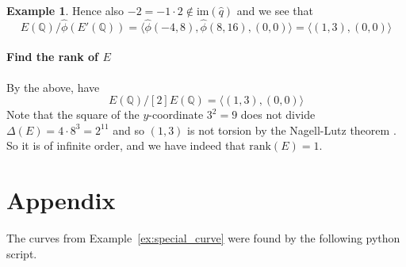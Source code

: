 \documentclass{scrartcl}
\newcommand{\Q}{\mathbb{Q}}
\newcommand{\im}{\mathrm{im}}
\theoremstyle{definition}
\newtheorem{example}[subsection]{Example}
\begin{document}
\begin{example}
    Hence also $-2 = -1 \cdot 2 \notin \im(\hat{q})$ and we see that
    \begin{equation*}
        E(\Q)/\hat{\phi}(E'(\Q)) = \langle \hat{\phi}(-4, 8), \hat{\phi}(8, 16), (0, 0) \rangle = \langle (1, 3), (0, 0) \rangle
    \end{equation*}

    \paragraph{Find the rank of $E$} By the above, have
    \begin{equation*}
        E(\Q)/[2]E(\Q) = \langle (1, 3), (0, 0) \rangle
    \end{equation*}
    Note that the square of the $y$-coordinate $3^2 = 9$ does not divide $\Delta(E) = 4 \cdot 8^3 = 2^{11}$ and so $(1, 3)$ is not torsion by the Nagell-Lutz theorem \cite[Thm 5.4]{lecture}.
    So it is of infinite order, and we have indeed that $\mathrm{rank}(E) = 1$.
\end{example}

\section{Appendix}
The curves from Example~\ref{ex:special_curve} were found by the following python script.


\printbibliography
\end{document}
